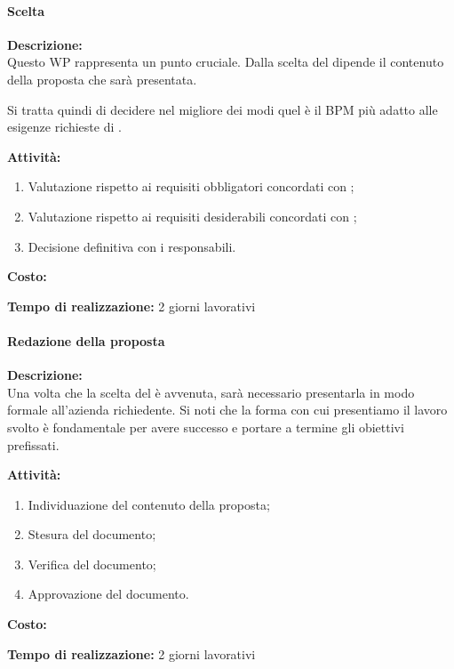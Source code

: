 \paragraph{Scelta \sw}
\begin{description}
\item{\bfseries Descrizione:}\\
Questo WP rappresenta un punto cruciale. Dalla scelta del  dipende il contenuto della proposta che sarà presentata.

Si tratta quindi di decidere  nel migliore dei modi quel è il  BPM più adatto alle esigenze richieste di \customer.

\item  {\bfseries Attività:}
	\begin{enumerate}
		\item Valutazione rispetto ai requisiti obbligatori concordati con \customer;
		\item Valutazione rispetto ai requisiti desiderabili concordati con \customer;
		\item Decisione definitiva con i responsabili.
		\end{enumerate}

\item  {\bfseries Costo:}
\item  {\bfseries Tempo di realizzazione:} 2 giorni lavorativi
\end{description}

\paragraph{Redazione della proposta }
\begin{description}
\item{\bfseries Descrizione:}\\
Una volta che la scelta del \sw è avvenuta, sarà necessario presentarla in modo formale all'azienda richiedente. Si noti che la forma con cui presentiamo il lavoro svolto è fondamentale per avere successo e portare a termine gli obiettivi prefissati.

\item  {\bfseries Attività:}
	\begin{enumerate}
	\item Individuazione del contenuto della proposta;
	\item Stesura del documento;
	\item Verifica del documento;
 	\item Approvazione del documento.	
	\end{enumerate}

\item  {\bfseries Costo:}
\item  {\bfseries Tempo di realizzazione:} 2 giorni lavorativi
\end{description}

